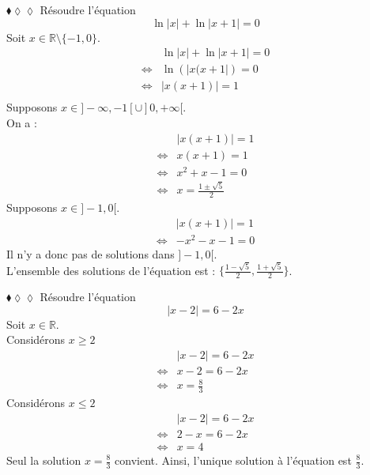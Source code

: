 \documentclass[11pt]{article}
\begin{document}
\begin{exercice}{$\blacklozenge\lozenge\lozenge$}{}
    Résoudre l'équation
    \begin{equation*}
        \ln|x|+\ln|x+1|=0
    \end{equation*}
    \tcblower
    Soit $x\in\mathbb{R}\setminus\{-1,0\}$.
    \begin{align*}
        &\ln|x|+\ln|x+1|=0\\
        \iff&\ln\left(|x(x+1|\right)=0\\
        \iff&|x(x+1)|=1\\
    \end{align*}
    Supposons $x\in]-\infty,-1[\cup]0,+\infty[$.\\
    On a :
    \begin{align*}
        &|x(x+1)|=1\\
        \iff&x(x+1)=1\\
        \iff&x^2+x-1=0\\
        \iff&x=\frac{1\pm\sqrt{5}}{2}
    \end{align*}
    Supposons $x\in]-1,0[$.
    \begin{align*}
        &|x(x+1)|=1\\
        \iff&-x^2-x-1=0
    \end{align*}
    Il n'y a donc pas de solutions dans $]-1,0[$.\\
    L'ensemble des solutions de l'équation est : $\{\frac{1-\sqrt{5}}{2},\frac{1+\sqrt{5}}{2}\}$.
\end{exercice}

\begin{exercice}{$\blacklozenge\lozenge\lozenge$}{}
    Résoudre l'équation
    \begin{equation*}
        |x-2|=6-2x
    \end{equation*}
    \tcblower
    Soit $x\in\mathbb{R}$.\\
    Considérons $x\geq2$
    \begin{align*}
        &|x-2|=6-2x\\
        \iff&x-2=6-2x\\
        \iff&x=\frac{8}{3}
    \end{align*}
    Considérons $x\leq2$
    \begin{align*}
        &|x-2|=6-2x\\
        \iff&2-x=6-2x\\
        \iff&x=4
    \end{align*}
    Seul la solution $x=\frac{8}{3}$ convient.
    Ainsi, l'unique solution à l'équation est $\frac{8}{3}$.
\end{exercice}
\end{document}
